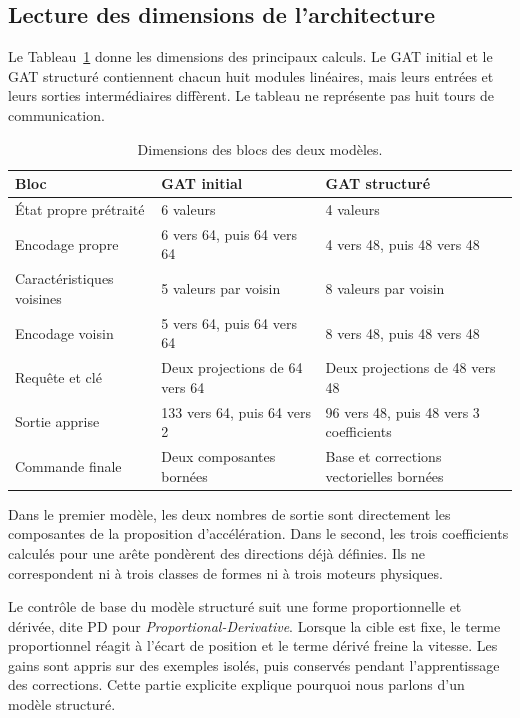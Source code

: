 \subsection{Lecture des dimensions de l'architecture}
Le Tableau~\ref{tab:architecture-comparee} donne les dimensions des principaux calculs. Le GAT initial et le GAT structuré contiennent chacun huit modules linéaires, mais leurs entrées et leurs sorties intermédiaires diffèrent. Le tableau ne représente pas huit tours de communication.
\begin{table}[htbp]
\caption{Dimensions des blocs des deux modèles.}
\label{tab:architecture-comparee}
\centering\small
\begin{tabularx}{\textwidth}{p{3.5cm}XX}
\toprule
Bloc & GAT initial & GAT structuré\\\midrule
État propre prétraité & 6 valeurs & 4 valeurs\\
Encodage propre & 6 vers 64, puis 64 vers 64 & 4 vers 48, puis 48 vers 48\\
Caractéristiques voisines & 5 valeurs par voisin & 8 valeurs par voisin\\
Encodage voisin & 5 vers 64, puis 64 vers 64 & 8 vers 48, puis 48 vers 48\\
Requête et clé & Deux projections de 64 vers 64 & Deux projections de 48 vers 48\\
Sortie apprise & 133 vers 64, puis 64 vers 2 & 96 vers 48, puis 48 vers 3 coefficients\\
Commande finale & Deux composantes bornées & Base et corrections vectorielles bornées\\\bottomrule
\end{tabularx}
\end{table}

Dans le premier modèle, les deux nombres de sortie sont directement les composantes de la proposition d'accélération. Dans le second, les trois coefficients calculés pour une arête pondèrent des directions déjà définies. Ils ne correspondent ni à trois classes de formes ni à trois moteurs physiques.

Le contrôle de base du modèle structuré suit une forme proportionnelle et dérivée, dite PD pour \textit{Proportional-Derivative}. Lorsque la cible est fixe, le terme proportionnel réagit à l'écart de position et le terme dérivé freine la vitesse. Les gains sont appris sur des exemples isolés, puis conservés pendant l'apprentissage des corrections. Cette partie explicite explique pourquoi nous parlons d'un modèle structuré.

